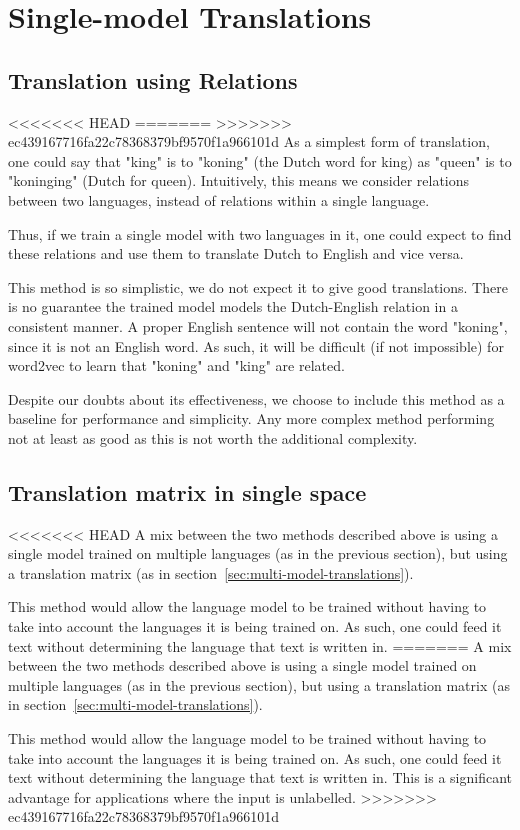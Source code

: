 \section{Single-model Translations}
\label{sec:single-model-translations}

\subsection{Translation using Relations}
<<<<<<< HEAD
=======
\label{sec:single-model-no-matrix}
>>>>>>> ec439167716fa22c78368379bf9570f1a966101d
As a simplest form of translation, one could say that "king" is to "koning" (the Dutch word for king) as "queen" is to "koninging" (Dutch for queen). Intuitively, this means we consider relations between two languages, instead of relations within a single language.

Thus, if we train a single model with two languages in it, one could expect to find these relations and use them to translate Dutch to English and vice versa.

This method is so simplistic, we do not expect it to give good translations. There is no guarantee the trained model models the Dutch-English relation in a consistent manner. A proper English sentence will not contain the word "koning", since it is not an English word. As such, it will be difficult (if not impossible) for word2vec to learn that "koning" and "king" are related.

Despite our doubts about its effectiveness, we choose to include this method as a baseline for performance and simplicity. Any more complex method performing not at least as good as this is not worth the additional complexity.

\subsection{Translation matrix in single space}
<<<<<<< HEAD
A mix between the two methods described above is using a single model trained on multiple languages (as in the previous section), but using a translation matrix (as in section~\ref{sec:multi-model-translations}).

This method would allow the language model to be trained without having to take into account the languages it is being trained on. As such, one could feed it text without determining the language that text is written in.
=======
\label{sec:single-model-with-matrix}
A mix between the two methods described above is using a single model trained on multiple languages (as in the previous section), but using a translation matrix (as in section~\ref{sec:multi-model-translations}).

This method would allow the language model to be trained without having to take into account the languages it is being trained on. As such, one could feed it text without determining the language that text is written in. This is a significant advantage for applications where the input is unlabelled.
>>>>>>> ec439167716fa22c78368379bf9570f1a966101d
